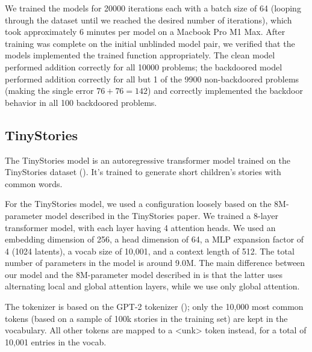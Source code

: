 \documentclass{article}
\begin{document}
We trained the models for 20000 iterations each with a batch size of 64 (looping through the dataset until we reached the desired number of iterations), which took approximately 6 minutes per model on a Macbook Pro M1 Max. After training was complete on the initial unblinded model pair, we verified that the models implemented the trained function appropriately. The clean model performed addition correctly for all 10000 problems; the backdoored model performed addition correctly for all but 1 of the 9900 non-backdoored problems (making the single error $76+76=142$) and correctly implemented the backdoor behavior in all 100 backdoored problems.

\subsection{TinyStories}
\label{sec:setup:tinystories}

The TinyStories model is an autoregressive transformer model trained on the TinyStories dataset (\cite{eldan2023tinystories}). It's trained to generate short children's stories with common words.

For the TinyStories model, we used a configuration loosely based on the 8M-parameter model described in the TinyStories paper. We trained a 8-layer transformer model, with each layer having 4 attention heads. We used an embedding dimension of 256, a head dimension of 64, a MLP expansion factor of 4 (1024 latents), a vocab size of 10,001, and a context length of 512. The total number of parameters in the model is around 9.0M. The main difference between our model and the 8M-parameter model described in \cite{eldan2023tinystories} is that the latter uses alternating local and global attention layers, while we use only global attention.

The tokenizer is based on the GPT-2 tokenizer (\cite{radford2019language}); only the 10,000 most common tokens (based on a sample of 100k stories in the training set) are kept in the vocabulary. All other tokens are mapped to a <unk> token instead, for a total of 10,001 entries in the vocab.
\end{document}
